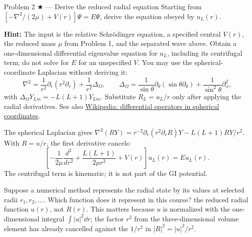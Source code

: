 \documentclass[11pt]{article}
\begin{document}
\begin{problem}{Problem 2 ★ — Derive the reduced radial equation}
Starting from $[-\nabla^2/(2\mu)+V(r)]\Psi=E\Psi$, derive the equation obeyed by
$u_L(r)$.

\textbf{Hint:} The input is the relative Schr\"odinger equation, a specified
central $V(r)$, the reduced mass $\mu$ from Problem 1, and the separated wave
above. Obtain a one-dimensional differential eigenvalue equation for $u_L$,
including its centrifugal term; do not solve for $E$ for an unspecified $V$.
You may use the spherical-coordinate Laplacian without deriving it:
\[
\nabla^2=\frac1{r^2}\partial_r(r^2\partial_r)+\frac1{r^2}\Delta_\Omega,
\qquad
\Delta_\Omega=\frac1{\sin\theta}\partial_\theta(\sin\theta\partial_\theta)
 +\frac1{\sin^2\theta}\partial_\phi^2,
\]
with $\Delta_\Omega Y_{Lm}=-L(L+1)Y_{Lm}$. Substitute $R_L=u_L/r$
only after applying the radial derivatives.
See also \href{https://en.wikipedia.org/wiki/Del_in_cylindrical_and_spherical_coordinates}{Wikipedia: differential operators in spherical coordinates}.
\end{problem}
\begin{solution}
The spherical Laplacian gives
$\nabla^2(RY)=r^{-2}\partial_r(r^2\partial_rR)Y-L(L+1)R Y/r^2$.
With $R=u/r$, the first derivative cancels:
\[
\left[-\frac1{2\mu}\frac{d^2}{dr^2}
+\frac{L(L+1)}{2\mu r^2}+V(r)\right]u_L(r)=E u_L(r).
\]
The centrifugal term is kinematic; it is not part of the GI potential.
\end{solution}
\begin{quiz}
Suppose a numerical method represents the radial state by its values at selected
radii $r_1,r_2,\ldots$. Which function does it represent in this course?
\answer the reduced radial function $u(r)$, not $R(r)$. This matters because
$u$ is normalized with the one-dimensional integral $\int|u|^2\dd r$; the
factor $r^2$ from the three-dimensional volume element has already cancelled
against the $1/r^2$ in $|R|^2=|u|^2/r^2$.
\end{quiz}
\end{document}
